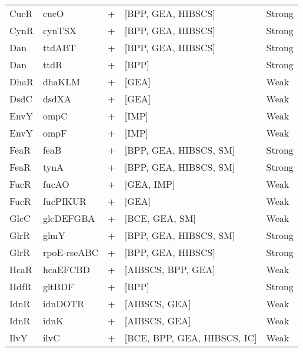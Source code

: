 \documentclass[12pt]{article}
\begin{document}
{\begin{longtable}[c]{lllll}
 CueR &           cueO &          + &              [BPP, GEA, HIBSCS] &              Strong \\
 CynR &         cynTSX &          + &              [BPP, GEA, HIBSCS] &              Strong \\
  Dan &         ttdABT &          + &              [BPP, GEA, HIBSCS] &              Strong \\
  Dan &           ttdR &          + &                           [BPP] &              Strong \\
 DhaR &         dhaKLM &          + &                           [GEA] &                Weak \\
 DsdC &          dsdXA &          + &                           [GEA] &                Weak \\
 EnvY &           ompC &          + &                           [IMP] &                Weak \\
 EnvY &           ompF &          + &                           [IMP] &                Weak \\
 FeaR &           feaB &          + &          [BPP, GEA, HIBSCS, SM] &              Strong \\
 FeaR &           tynA &          + &          [BPP, GEA, HIBSCS, SM] &              Strong \\
 FucR &          fucAO &          + &                      [GEA, IMP] &                Weak \\
 FucR &       fucPIKUR &          + &                           [GEA] &                Weak \\
 GlcC &      glcDEFGBA &          + &                  [BCE, GEA, SM] &                Weak \\
 GlrR &           glmY &          + &          [BPP, GEA, HIBSCS, SM] &              Strong \\
 GlrR &    rpoE-rseABC &          + &              [BPP, GEA, HIBSCS] &              Strong \\
 HcaR &       hcaEFCBD &          + &              [AIBSCS, BPP, GEA] &                Weak \\
 HdfR &         gltBDF &          + &                           [BPP] &              Strong \\
 IdnR &        idnDOTR &          + &                   [AIBSCS, GEA] &                Weak \\
 IdnR &           idnK &          + &                   [AIBSCS, GEA] &                Weak \\
 IlvY &           ilvC &          + &     [BCE, BPP, GEA, HIBSCS, IC] &                Weak \\

\end{longtable}}
\end{document}
